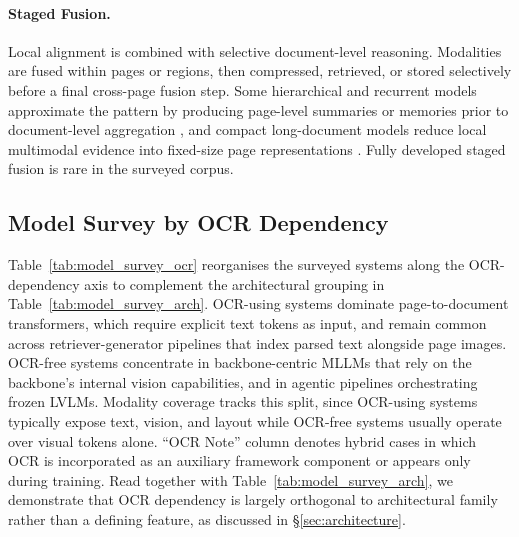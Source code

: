 \documentclass[11pt]{article}
\begin{document}
\paragraph{Staged Fusion.}
Local alignment is combined with selective document-level reasoning. Modalities are fused within pages or regions, then compressed, retrieved, or stored selectively before a final cross-page fusion step. Some hierarchical and recurrent models approximate the pattern by producing page-level summaries or memories prior to document-level aggregation \cite{tito2023hierarchical, dong2024multi}, and compact long-document models reduce local multimodal evidence into fixed-size page representations \cite{hannan2025docslm}. Fully developed staged fusion is rare in the surveyed corpus.

\subsection{Model Survey by OCR Dependency}
\label{app:ocr-survey}
Table~\ref{tab:model_survey_ocr} reorganises the surveyed systems along the OCR-dependency axis to complement the architectural grouping in Table~\ref{tab:model_survey_arch}. OCR-using systems dominate page-to-document transformers, which require explicit text tokens as input, and remain common across retriever-generator pipelines that index parsed text alongside page images. OCR-free systems concentrate in backbone-centric MLLMs that rely on the backbone's internal vision capabilities, and in agentic pipelines orchestrating frozen LVLMs. Modality coverage tracks this split, since OCR-using systems typically expose text, vision, and layout while OCR-free systems usually operate over visual tokens alone. ``OCR Note'' column denotes hybrid cases in which OCR is incorporated as an auxiliary framework component or appears only during training. Read together with Table~\ref{tab:model_survey_arch}, we demonstrate that OCR dependency is largely orthogonal to architectural family rather than a defining feature, as discussed in \S\ref{sec:architecture}.
\end{document}

